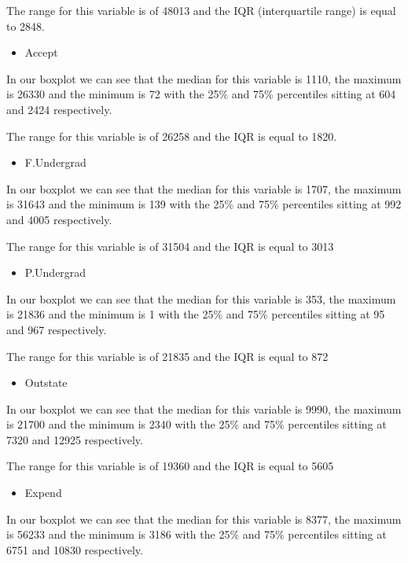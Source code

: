 \documentclass[]{article}
\providecommand{\tightlist}{%
  \setlength{\itemsep}{0pt}\setlength{\parskip}{0pt}}
\begin{document}
The range for this variable is of 48013 and the IQR (interquartile
range) is equal to 2848.

\begin{itemize}
\tightlist
\item
  Accept
\end{itemize}

In our boxplot we can see that the median for this variable is 1110, the
maximum is 26330 and the minimum is 72 with the 25\% and 75\%
percentiles sitting at 604 and 2424 respectively.

The range for this variable is of 26258 and the IQR is equal to 1820.

\begin{itemize}
\tightlist
\item
  F.Undergrad
\end{itemize}

In our boxplot we can see that the median for this variable is 1707, the
maximum is 31643 and the minimum is 139 with the 25\% and 75\%
percentiles sitting at 992 and 4005 respectively.

The range for this variable is of 31504 and the IQR is equal to 3013

\begin{itemize}
\tightlist
\item
  P.Undergrad
\end{itemize}

In our boxplot we can see that the median for this variable is 353, the
maximum is 21836 and the minimum is 1 with the 25\% and 75\% percentiles
sitting at 95 and 967 respectively.

The range for this variable is of 21835 and the IQR is equal to 872

\begin{itemize}
\tightlist
\item
  Outstate
\end{itemize}

In our boxplot we can see that the median for this variable is 9990, the
maximum is 21700 and the minimum is 2340 with the 25\% and 75\%
percentiles sitting at 7320 and 12925 respectively.

The range for this variable is of 19360 and the IQR is equal to 5605

\begin{itemize}
\tightlist
\item
  Expend
\end{itemize}

In our boxplot we can see that the median for this variable is 8377, the
maximum is 56233 and the minimum is 3186 with the 25\% and 75\%
percentiles sitting at 6751 and 10830 respectively.
\end{document}
